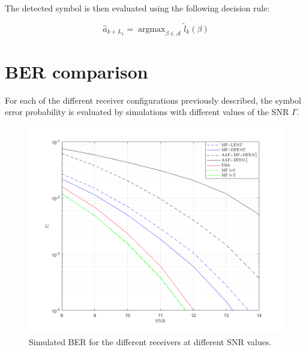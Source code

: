 \documentclass[a4paper, 12pt]{report}
\DeclareMathOperator*{\argmax}{argmax}
\begin{document}
The detected symbol is then evaluated using the following decision rule:

\begin{equation}
\hat{a}_{k+L_1} = \argmax_{\beta \in \mathcal{A}} \tilde{l}_k(\beta)
\end{equation}

\clearpage
\section*{BER comparison}
For each of the different receiver configurations previously described, the symbol error probability is evaluated by simulations with different values of the SNR $\Gamma$. 

\begin{figure}[H]
	\centering
	\includegraphics[width=12cm]{images/PevsGamma}
	\caption{Simulated BER for the different receivers at different SNR values.}\label{Pe}
\end{figure}
\end{document}
